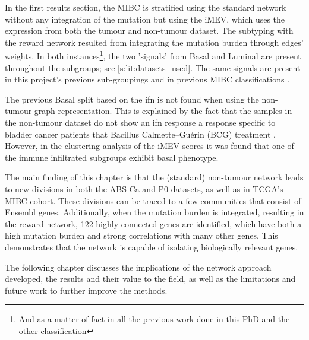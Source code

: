 In the first results section, the MIBC is stratified using the standard network without any integration of the mutation but using the iMEV, which uses the expression from both the tumour and non-tumour dataset. The subtyping with the reward network resulted from integrating the mutation burden through edges' weights. In both instances\footnote{And as a matter of fact in all the previous work done in this PhD and the other classification}, the two 'signals' from Basal and Luminal are present throughout the subgroups; see \cref{s:lit:datasets_used}. The same signals are present in this project's previous sub-groupings and in previous MIBC classifications \citep{Robertson2017-mg,Kamoun2020-tj,Marzouka2018-ge}.

The previous Basal split based on the \acrlong{ifn} is not found when using the non-tumour graph representation. This is explained by the fact that the samples in the non-tumour dataset do not show an \acrshort{ifn} response a response specific to bladder cancer patients that Bacillus Calmette–Guérin (BCG) treatment \citep{Baker2022-bj}. However,  in the clustering analysis of the iMEV scores it was found that one of the immune infiltrated subgroups exhibit basal phenotype.

The main finding of this chapter is that the (standard) non-tumour network leads to new divisions in both the ABS-Ca and P0 datasets, as well as in TCGA's MIBC cohort. These divisions can be traced to a few communities that consist of Ensembl genes. Additionally, when the mutation burden is integrated, resulting in the reward network, 122 highly connected genes are identified, which have both a high mutation burden and strong correlations with many other genes. This demonstrates that the network is capable of isolating biologically relevant genes.

The following chapter discusses the implications of the network approach developed, the results and their value to the field, as well as the limitations and future work to further improve the methods.



\newpage


